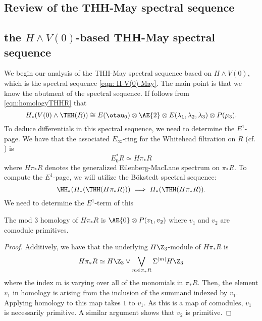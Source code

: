 \subsection{Review of the THH-May spectral sequence}

\subsection{the $H\wedge V(0)$-based THH-May spectral sequence}

We begin our analysis of the THH-May spectral sequence based on $H\wedge V(0)$, which is the spectral sequence \eqref{eqn: H-V(0)-May}. The main point is that we know the abutment of the spectral sequence. If follows from \eqref{eqn:homologyTHHR} that
\[
H_*(V(0)\wedge \THH(R))\cong E(\otau_0)\otimes \AE{2}\otimes E(\lambda_1, \lambda_2, \lambda_3)\otimes P(\mu_3). 
\]
To deduce differentials in this spectral sequence, we need to determine the $E^1$-page. We have that the associated $E_\infty$-ring for the Whitehead filtration on $R$ (cf. \cite{THH-May}) is 
\[
E^*_0R\simeq H\pi_*R
\]
where $H\pi_*R$ denotes the generalized Eilenberg-MacLane spectrum on $\pi_*R$. 
To compute the $E^1$-page, we will utilize the B\"okstedt spectral sequence:
\[
\HH_*(H_*(\THH(H\pi_*R)))\implies H_*( \THH(H\pi_*R)).
\]
We need to determine the $E^1$-term of this 
\begin{lem}
	The mod 3 homology of $H\pi_*R$ is $\AE{0}\otimes P(v_1, v_2)$ where $v_1$ and $v_2$ are comodule primitives.
\end{lem}
\begin{proof}
	Additively, we have that the underlying $H\Z_3$-module of $H\pi_*R$ is 
	\[
	H\pi_*R\simeq H\Z_3\vee \bigvee_{m\in \pi_*R}\Sigma^{|m|}H\Z_3
	\]
	where the index $m$ is varying over all of the monomials in $\pi_*R$. Then, the element $v_1$ in homology is arising from the inclusion of the summand indexed by $v_1$. Applying homology to this map takes $1$ to $v_1$. As this is a map of comodules, $v_1$ is necessarily primitive. A similar argument shows that $v_2$ is primitive.
\end{proof}

